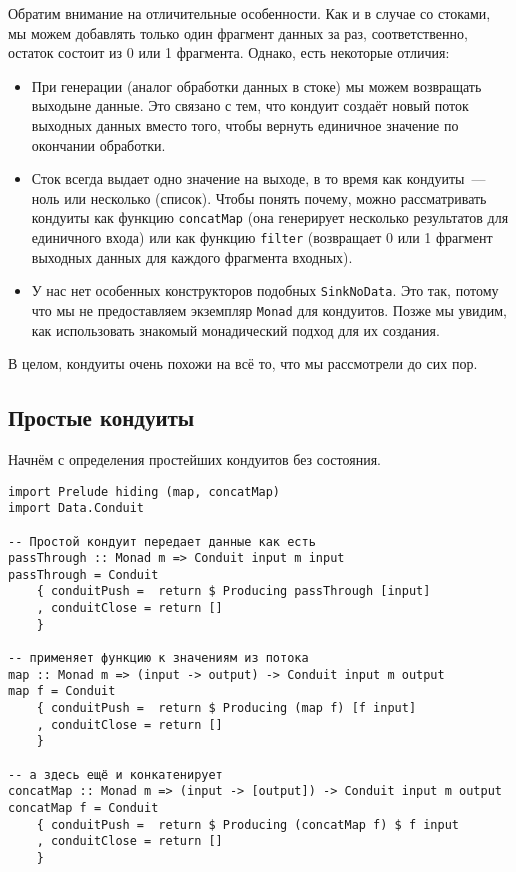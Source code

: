 Обратим внимание на отличительные особенности. Как и в случае со стоками, мы можем
добавлять только один фрагмент данных за раз, соответственно, остаток состоит из 0 или 1 фрагмента.
Однако, есть некоторые отличия:

\begin{itemize}
\item При генерации (аналог обработки данных в стоке) мы можем возвращать выходыне данные.
Это связано с тем, что кондуит создаёт новый поток выходных данных вместо того, чтобы вернуть единичное значение по окончании обработки.
\item Сток всегда выдает одно значение на выходе, в то время как кондуиты~--- ноль или
несколько (список). Чтобы понять почему, можно рассматривать кондуиты как функцию
\lstinline'concatMap' (она генерирует несколько результатов для единичного входа)
или как функцию \lstinline'filter' (возвращает 0 или 1 фрагмент выходных данных для каждого фрагмента входных).
\item У нас нет особенных конструкторов подобных \lstinline'SinkNoData'. Это так, потому что мы не
предоставляем
экземпляр \lstinline'Monad' для кондуитов. Позже мы увидим, как использовать знакомый
монадический подход для их создания.
\end{itemize}
В целом, кондуиты очень похожи на всё то, что мы рассмотрели до сих пор.

\subsection{Простые кондуиты}

Начнём с определения простейших кондуитов без состояния.
\begin{lstlisting}
import Prelude hiding (map, concatMap)
import Data.Conduit

-- Простой кондуит передает данные как есть
passThrough :: Monad m => Conduit input m input
passThrough = Conduit
    { conduitPush =  return $ Producing passThrough [input]
    , conduitClose = return []
    }

-- применяет функцию к значениям из потока
map :: Monad m => (input -> output) -> Conduit input m output
map f = Conduit
    { conduitPush =  return $ Producing (map f) [f input]
    , conduitClose = return []
    }

-- а здесь ещё и конкатенирует
concatMap :: Monad m => (input -> [output]) -> Conduit input m output
concatMap f = Conduit
    { conduitPush =  return $ Producing (concatMap f) $ f input
    , conduitClose = return []
    }
\end{lstlisting}

